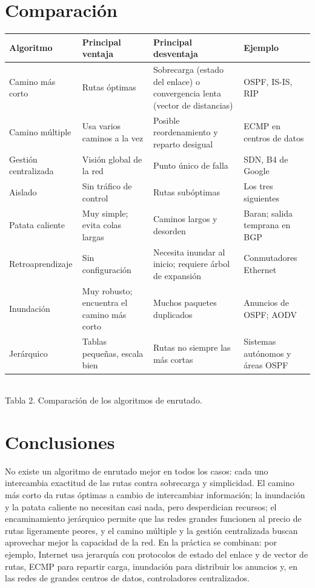 \documentclass[12pt,letterpaper]{article}
\begin{document}
\section{Comparación}
\begin{center}
\small
\renewcommand{\arraystretch}{1.15}
\begin{tabular}{|>{\raggedright\arraybackslash}p{3.2cm}|>{\raggedright\arraybackslash}p{3.6cm}|>{\raggedright\arraybackslash}p{3.6cm}|>{\raggedright\arraybackslash}p{2.9cm}|}
\hline
\textbf{Algoritmo} & \textbf{Principal ventaja} & \textbf{Principal desventaja} & \textbf{Ejemplo}\\
\hline
Camino más corto & Rutas óptimas & Sobrecarga (estado del enlace) o convergencia lenta (vector de distancias) & OSPF, IS-IS, RIP\\ \hline
Camino múltiple & Usa varios caminos a la vez & Posible reordenamiento y reparto desigual & ECMP en centros de datos\\ \hline
Gestión centralizada & Visión global de la red & Punto único de falla & SDN, B4 de Google\\ \hline
Aislado & Sin tráfico de control & Rutas subóptimas & Los tres siguientes\\ \hline
Patata caliente & Muy simple; evita colas largas & Caminos largos y desorden & Baran; salida temprana en BGP\\ \hline
Retroaprendizaje & Sin configuración & Necesita inundar al inicio; requiere árbol de expansión & Conmutadores Ethernet\\ \hline
Inundación & Muy robusto; encuentra el camino más corto & Muchos paquetes duplicados & Anuncios de OSPF; AODV\\ \hline
Jerárquico & Tablas pequeñas, escala bien & Rutas no siempre las más cortas & Sistemas autónomos y áreas OSPF\\ \hline
\end{tabular}\\[3pt]
{\footnotesize Tabla 2. Comparación de los algoritmos de enrutado.}
\end{center}

\section{Conclusiones}
No existe un algoritmo de enrutado mejor en todos los casos: cada uno intercambia exactitud de las rutas contra sobrecarga y simplicidad. El camino más corto da rutas óptimas a cambio de intercambiar información; la inundación y la patata caliente no necesitan casi nada, pero desperdician recursos; el encaminamiento jerárquico permite que las redes grandes funcionen al precio de rutas ligeramente peores, y el camino múltiple y la gestión centralizada buscan aprovechar mejor la capacidad de la red. En la práctica se combinan: por ejemplo, Internet usa jerarquía con protocolos de estado del enlace y de vector de rutas, ECMP para repartir carga, inundación para distribuir los anuncios y, en las redes de grandes centros de datos, controladores centralizados.
\end{document}
